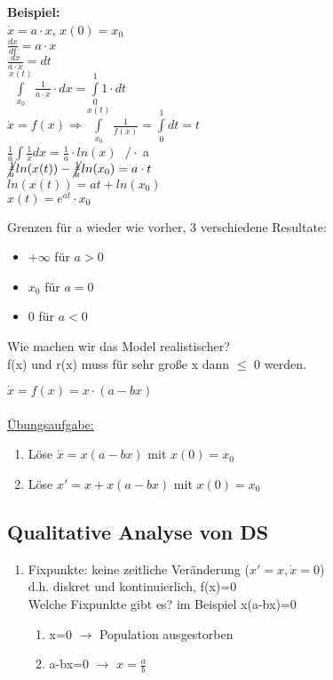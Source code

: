 \textbf{Beispiel:}\\
$\dot{x}=a \cdot x$, $x(0)=x_0$\\
$\displaystyle \frac{dx}{dt}=a \cdot x$\\
$\displaystyle \frac{dx}{a \cdot x} = dt$\\
$\int \limits_{x_0}^{x(t)} \frac{1}{a \cdot x} \cdot dx = \int \limits_{0}^{1} 1 \cdot dt$\\
$\dot{x} = f(x) \Rightarrow \int \limits_{x_0}^{x(t)} \frac{1}{f(x)} = \int \limits_{0}^{1} dt = t$\\
$\frac{1}{a} \int \frac{1}{x} dx = \frac{1}{a} \cdot ln(x) \text{  }/ \cdot$ a \\
$\cancel{\frac{1}{a}} ln(x(t)) - \cancel{\frac{1}{a}} ln(x_0)=a \cdot t$\\
$ln(x(t))= a t + ln(x_0)$\\
$x(t)=e^{at} \cdot x_0$

Grenzen für a wieder wie vorher, 3 verschiedene Resultate:
\begin{itemize}
	\item $+\infty$ für $a > 0$
	\item $x_0$ für $a=0$
	\item 0 für $a<0$
\end{itemize}

Wie machen wir das Model realistischer?\\
f(x) und r(x) muss für sehr große x dann $\leq$ 0 werden.


$\dot{x}=f(x)=x \cdot (a-bx)$\\
\\
\underline{Übungsaufgabe:}
\begin{enumerate}
	\item Löse $\dot{x}=x(a-bx)$ mit $x(0)=x_0$
	\item Löse $x'=x+x(a-bx)$ mit $x(0)=x_0$
\end{enumerate}

\subsection{Qualitative Analyse von DS}
\begin{enumerate}
	\item Fixpunkte: keine zeitliche Veränderung ($x'=x, \dot{x}=0$)\\
	d.h. diskret und kontinuierlich, f(x)=0\\
	Welche Fixpunkte gibt es? im Beispiel x(a-bx)=0\\
	\begin{enumerate}
		\item x=0 $\rightarrow$ Population ausgestorben
		\item a-bx=0 $\rightarrow$ $x=\frac{a}{b}$\\
	\end{enumerate}
\end{enumerate}

